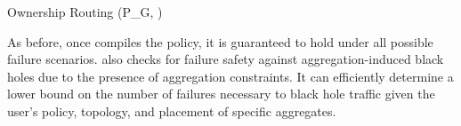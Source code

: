 \begin{code}
Ownership \AND{} Routing \AND{} \Agg(P_G, \In \Link \Out)
\end{code}

As before, once \sysname compiles the policy, it is guaranteed to hold under
all possible failure scenarios. \sysname also checks for failure safety against aggregation-induced black holes due to the presence of aggregation constraints. It can efficiently determine a lower bound on the number of failures necessary to black hole traffic given the user's policy, topology, and placement of specific aggregates.









%
%
%
%
%
%
